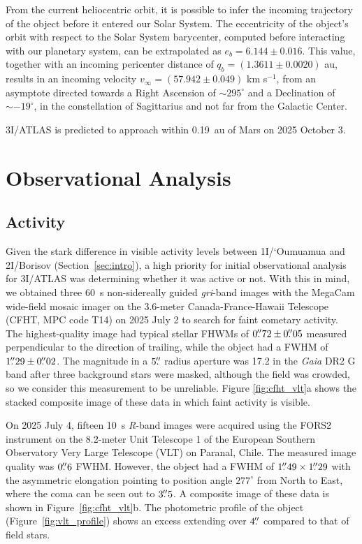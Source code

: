 \documentclass[linenumbers,twocolumn,longbib]{aastex7}
\begin{document}
From the current heliocentric orbit, it is possible to infer the incoming trajectory of the object before it entered our Solar System. The eccentricity of the object's orbit with respect to the Solar System barycenter, computed before interacting with our planetary system, can be extrapolated as $e_b = 6.144 \pm 0.016$. This value, together with an incoming pericenter distance of $q_b = (1.3611 \pm 0.0020)$ au, results in an incoming velocity $v_{\infty} = (57.942 \pm 0.049)$ km s$^{-1}$, from an asymptote directed towards a Right Ascension of $\sim 295^\circ$ and a Declination of $\sim -19^\circ$, in the constellation of Sagittarius and not far from the Galactic Center.

3I/ATLAS is predicted to approach within 0.19~au of Mars on 2025 October 3.

\section{Observational Analysis}\label{sec:observations}

\subsection{Activity}\label{sec:activity}

Given the stark difference in visible activity levels between 1I/`Oumuamua and 2I/Borisov (Section~\ref{sec:intro}), a high priority for initial observational analysis for 3I/ATLAS was determining whether it was active or not. With this in mind, we obtained three 60~s non-sidereally guided \textit{gri}-band images with the MegaCam wide-field mosaic imager \citep{boulade2003_megacam} on the 3.6-meter Canada-France-Hawaii Telescope (CFHT, MPC code T14) on 2025 July 2 to search for faint cometary activity. The highest-quality image had typical stellar FHWMs of $0\mbox{$.\!\!^{\prime\prime}$}72\pm0\mbox{$.\!\!^{\prime\prime}$}05$ measured perpendicular to the direction of trailing, while the object had a FWHM of $1\mbox{$.\!\!^{\prime\prime}$}29 \pm 0\mbox{$.\!\!^{\prime\prime}$}02$. The magnitude in a $5\mbox{$.\!\!^{\prime\prime}$}$ radius aperture was 17.2 in the \textit{Gaia} DR2 G band after three background stars were masked, although the field was crowded, so we consider this measurement to be unreliable. Figure \ref{fig:cfht_vlt}a shows the stacked composite image of these data in which faint activity is visible.

On 2025 July 4, fifteen 10~s \textit{R}-band images were acquired using the FORS2 instrument on the 8.2-meter Unit Telescope 1 of the European Southern Observatory Very Large Telescope (VLT) on Paranal, Chile. The measured image quality was $0\mbox{$.\!\!^{\prime\prime}$}6$ FWHM. However, the object had a FWHM of $1\mbox{$.\!\!^{\prime\prime}$}49 \times 1\mbox{$.\!\!^{\prime\prime}$}29$ with the asymmetric elongation pointing to position angle $277^{\circ}$ from North to East, where the coma can be seen out to $3\mbox{$.\!\!^{\prime\prime}$}5$. A composite image of these data is shown in Figure~\ref{fig:cfht_vlt}b. The photometric profile of the object (Figure~\ref{fig:vlt_profile}) shows an excess extending over $4\mbox{$.\!\!^{\prime\prime}$}$ compared to that of field stars.
\end{document}
